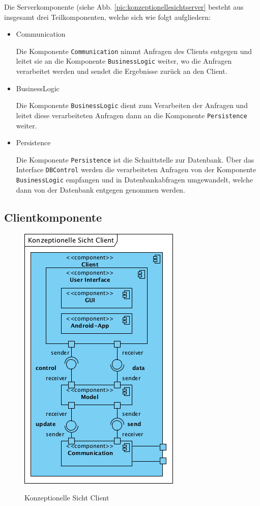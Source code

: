 \documentclass[fontsize=12pt,paper=a4,twoside]{scrartcl}
\begin{document}
Die Serverkomponente (siehe Abb. \vref{pic:konzeptionellesichtserver} besteht aus insgesamt drei Teilkomponenten, welche sich wie folgt aufgliedern:

\begin{itemize}
\item{Communication}

Die Komponente \texttt{Communication} nimmt Anfragen des Clients entgegen und leitet sie an die Komponente \texttt{BusinessLogic} weiter, wo die Anfragen verarbeitet werden und sendet die Ergebnisse zurück an den Client.

\item{BusinessLogic}

Die Komponente \texttt{BusinessLogic} dient zum Verarbeiten der Anfragen und leitet diese verarbeiteten Anfragen dann an die Komponente \texttt{Persistence} weiter.

\item{Persistence}

Die Komponente \texttt{Persistence} ist die Schnittstelle zur Datenbank. Über das Interface \texttt{DBControl} werden die verarbeiteten Anfragen von der Komponente \texttt{BusinessLogic} empfangen und in Datenbankabfragen umgewandelt, welche dann von der Datenbank entgegen genommen werden.

\end{itemize}

\subsection{Clientkomponente}
\label{sec:client}

\begin{figure} [H] 
\caption{Konzeptionelle Sicht Client}  \centering
	\includegraphics[scale=2]{Diagramme/KonzeptionelleSichtClient.png} 
	\label{pic:konzeptionellesichtclient} 
\end{figure}
\end{document}
